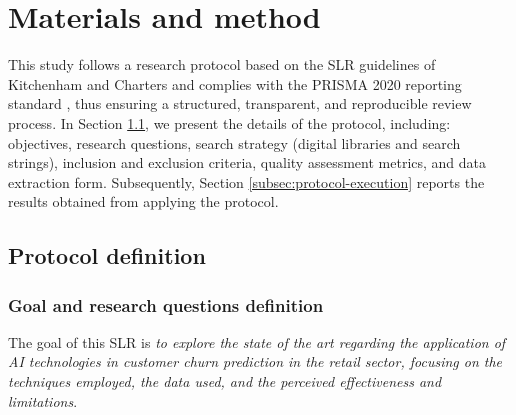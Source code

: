 \documentclass[preprint,12pt]{elsarticle}
\begin{document}
\section{Materials and method}
\label{sec:methodology}

This study follows a research protocol based on the SLR guidelines of Kitchenham and Charters \cite{Kitchenham-Charters-guidelines} and complies with the PRISMA 2020 reporting standard \cite{PRISMA_2020_statement}, thus ensuring a structured, transparent, and reproducible review process. 
In Section \ref{subsec:protocol-definition}, we present the details of the protocol, including: objectives, research questions, search strategy (digital libraries and search strings), inclusion and exclusion criteria, quality assessment metrics, and data extraction form. Subsequently, Section \ref{subsec:protocol-execution} reports the results obtained from applying the protocol.

\subsection{Protocol definition}
\label{subsec:protocol-definition}

\subsubsection{Goal and research questions definition} 
The goal of this SLR is \textit{to explore the state of the art regarding the application of AI technologies in customer churn prediction in the retail sector, focusing on the techniques employed, the data used, and the perceived effectiveness and limitations}. 
\end{document}
